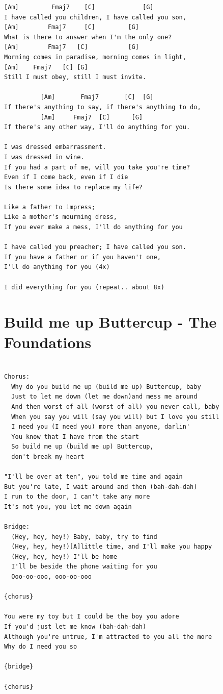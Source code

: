 \documentclass[
]{book}
\let\stdsection\section
\renewcommand\section{\clearpage\stdsection}
\begin{document}
\begin{verbatim}
[Am]         Fmaj7    [C]             [G]
I have called you children, I have called you son,
[Am]        Fmaj7     [C]         [G]
What is there to answer when I'm the only one?
[Am]        Fmaj7   [C]           [G]
Morning comes in paradise, morning comes in light,
[Am]    Fmaj7   [C] [G]
Still I must obey, still I must invite.

          [Am]       Fmaj7       [C]  [G]
If there's anything to say, if there's anything to do,
          [Am]     Fmaj7  [C]      [G]
If there's any other way, I'll do anything for you.

I was dressed embarrassment. 
I was dressed in wine. 
If you had a part of me, will you take you're time? 
Even if I come back, even if I die 
Is there some idea to replace my life? 

Like a father to impress; 
Like a mother's mourning dress, 
If you ever make a mess, I'll do anything for you 

I have called you preacher; I have called you son. 
If you have a father or if you haven't one, 
I'll do anything for you (4x)

I did everything for you (repeat.. about 8x)
\end{verbatim}

\hypertarget{selected-songs-build-me-up-buttercup}{%
\section{Build me up Buttercup - The Foundations}\label{selected-songs-build-me-up-buttercup}}

\begin{verbatim}

Chorus:
  Why do you build me up (build me up) Buttercup, baby
  Just to let me down (let me down)and mess me around
  And then worst of all (worst of all) you never call, baby
  When you say you will (say you will) but I love you still
  I need you (I need you) more than anyone, darlin'
  You know that I have from the start
  So build me up (build me up) Buttercup, 
  don't break my heart

"I'll be over at ten", you told me time and again
But you're late, I wait around and then (bah-dah-dah)
I run to the door, I can't take any more
It's not you, you let me down again

Bridge:
  (Hey, hey, hey!) Baby, baby, try to find
  (Hey, hey, hey!)[A]little time, and I'll make you happy
  (Hey, hey, hey!) I'll be home
  I'll be beside the phone waiting for you
  Ooo-oo-ooo, ooo-oo-ooo

{chorus}

You were my toy but I could be the boy you adore
If you'd just let me know (bah-dah-dah)
Although you're untrue, I'm attracted to you all the more
Why do I need you so

{bridge}

{chorus}

\end{verbatim}
\end{document}
